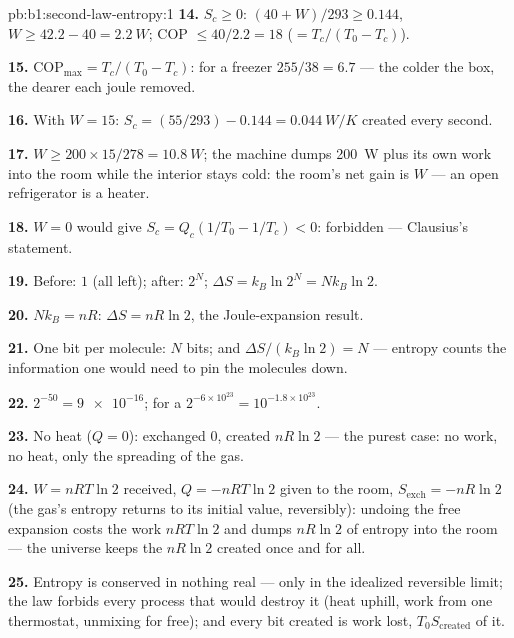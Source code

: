 \begin{solution}{pb:b1:second-law-entropy:1}
\textbf{14.} $S_c \geq 0$: $(40 + W)/293 \geq 0.144$, $W \geq 42.2 - 40 =
\qty{2.2}{W}$; COP $\leq 40/2.2 = 18$ ($= T_c/(T_0 - T_c)$).

\textbf{15.} $\mathrm{COP}_{\max} = T_c/(T_0 - T_c)$: for a freezer $255/38 = 6.7$
--- the colder the box, the dearer each joule removed.

\textbf{16.} With $W = 15$: $S_c = (55/293) - 0.144 = \qty{0.044}{W/K}$ created
every second.

\textbf{17.} $W \geq 200 \times 15/278 = \qty{10.8}{W}$; the machine dumps
\qty{200}{W} plus its own work into the room while the interior stays
cold: the room's net gain is $W$ --- an open refrigerator is a heater.

\textbf{18.} $W = 0$ would give $S_c = Q_c(1/T_0 - 1/T_c) < 0$: forbidden ---
Clausius's statement.

\textbf{19.} Before: $1$ (all left); after: $2^N$; $\Delta S = k_B\ln2^N =
Nk_B\ln2$.

\textbf{20.} $Nk_B = nR$: $\Delta S = nR\ln2$, the Joule-expansion result.

\textbf{21.} One bit per molecule: $N$ bits; and $\Delta S/(k_B\ln2) = N$ ---
entropy counts the information one would need to pin the molecules
down.

\textbf{22.} $2^{-50} = \num{9e-16}$; for a  $2^{-6\times10^{23}} =
10^{-1.8\times10^{23}}$.

\textbf{23.} No heat ($Q = 0$): exchanged $0$, created $nR\ln2$ --- the
purest case: no work, no heat, only the spreading of the gas.

\textbf{24.} $W = nRT\ln2$ received, $Q = -nRT\ln2$ given to the room,
$S_{\mathrm{exch}} = -nR\ln2$ (the gas's entropy returns to its initial
value, reversibly): undoing the free expansion costs the work $nRT\ln2$
and dumps $nR\ln2$ of entropy into the room --- the universe keeps the
$nR\ln2$ created once and for all.

\textbf{25.} Entropy is conserved in nothing real --- only in the
idealized reversible limit; the law forbids every process that would
destroy it (heat uphill, work from one thermostat, unmixing for free);
and every bit created is work lost, $T_0S_{\mathrm{created}}$ of it.
\end{solution}

